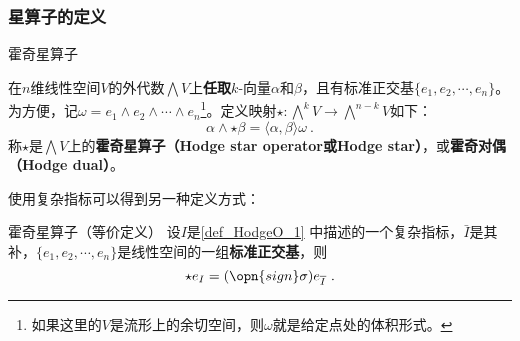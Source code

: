 






\subsubsection{星算子的定义}


\begin{definition}{霍奇星算子}\label{def_HodgeO_2}

在$n$维线性空间$V$的外代数$\bigwedge V$上\textbf{任取}$k$-向量$\alpha$和$\beta$，且有标准正交基$\{e_1, e_2, \cdots, e_n\}$。为方便，记$\omega=e_1\wedge e_2\wedge \cdots\wedge e_n$\footnote{如果这里的$V$是流形上的余切空间，则$\omega$就是给定点处的体积形式。}。定义映射$\star:\bigwedge^k V \to \bigwedge^{n-k} V$如下：
\begin{equation}
\alpha\wedge \star\beta = \langle\alpha, \beta\rangle\omega~.
\end{equation}
称$\star$是$\bigwedge V$上的\textbf{霍奇星算子（Hodge star operator或Hodge star）}，或\textbf{霍奇对偶（Hodge dual）}。

\end{definition}


使用复杂指标可以得到另一种定义方式：


\begin{theorem}{霍奇星算子（等价定义）}\label{the_HodgeO_1}
设$I$是\autoref{def_HodgeO_1} 中描述的一个复杂指标，$\bar{I}$是其补，$\{e_1, e_2, \cdots, e_n\}$是线性空间的一组\textbf{标准正交基}，则
\begin{equation}
\star e_I = (\opn{sign}\sigma) e_{\overline{I}}~.
\end{equation}
\end{theorem}



